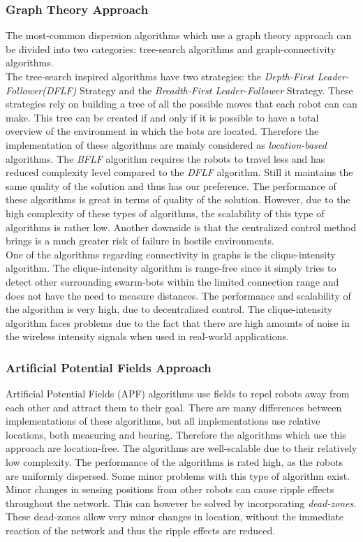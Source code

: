 \subsubsection{Graph Theory Approach}
The most-common dispersion algorithms which use a graph theory approach can be divided into two categories: tree-search algorithms and graph-connectivity algorithms.\\
The tree-search inspired algorithms have two strategies: the \emph{Depth-First Leader-Follower(DFLF)} Strategy and the \emph{Breadth-First Leader-Follower} Strategy. \cite{hsiang2004algorithms}
These strategies rely on building a tree of all the possible moves that each robot can can make.
This tree can be created if and only if it is possible to have a total overview of the environment in which the bots are located.
Therefore the implementation of these algorithms are mainly considered as \emph{location-based} algorithms.
The \emph{BFLF} algorithm requires the robots to travel less and has reduced complexity level compared to the \emph{DFLF} algorithm.
Still it maintains the same quality of the solution and thus has our preference.
The performance of these algorithms is great in terms of quality of the solution.
However, due to the high complexity of these types of algorithms, the scalability of this type of algorithms is rather low.
Another downside is that the centralized control method brings is a much greater risk of failure in hostile environments.\\
One of the algorithms regarding connectivity in graphs is the clique-intensity algorithm. \cite{ugur2007dispersion}
The clique-intensity algorithm is range-free since it simply tries to detect other surrounding swarm-bots within the limited connection range and does not have the need to measure distances.
The performance and scalability of the algorithm is very high, due to decentralized control.
The clique-intensity algorithm faces problems due to the fact that there are high amounts of noise in the wireless intensity signals when used in real-world applications.

\subsubsection{Artificial Potential Fields Approach}
Artificial Potential Fields (APF) algorithms use fields to repel robots away from each other and attract them to their goal. \cite{khatib1986real}
There are many differences between implementations of these algorithms, but all implementations use relative locations, both measuring and bearing.
Therefore the algorithms which use this approach are location-free. \cite{pakanati2010swarm}
The algorithms are well-scalable due to their relatively low complexity.
The performance of the algorithms is rated high, as the robots are uniformly dispersed.
Some minor problems with this type of algorithm exist.
Minor changes in sensing positions from other robots can cause ripple effects throughout the network.
This can however be solved by incorporating \emph{dead-zones}.
These dead-zones allow very minor changes in location, without the immediate reaction of the network and thus the ripple effects are reduced. \cite{pakanati2010swarm}

